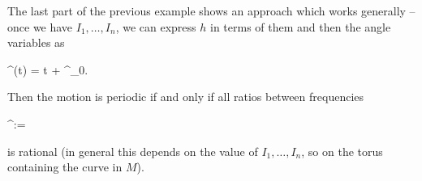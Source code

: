 \documentclass[main.tex]{subfiles}
\begin{document}
\begin{remark}
	The last part of the previous example shows an approach which works generally -- once we have $I_1, \ldots, I_n$, we can express $h$ in terms of them and then the angle variables as
	\begin{eqalign}
		\phi^\alpha (t) =  t + \phi^\alpha_0.
	\end{eqalign}
	Then the motion is periodic if and only if all ratios between frequencies
	\begin{eqalign}
		\omega^\alpha := \pder{h(I_1, \ldots, I_n)}{I_\alpha}
	\end{eqalign}
	is rational (in general this depends on the value of $I_1, \ldots, I_n$, so on the torus containing the curve in $M$). 
\end{remark}
\end{document}
